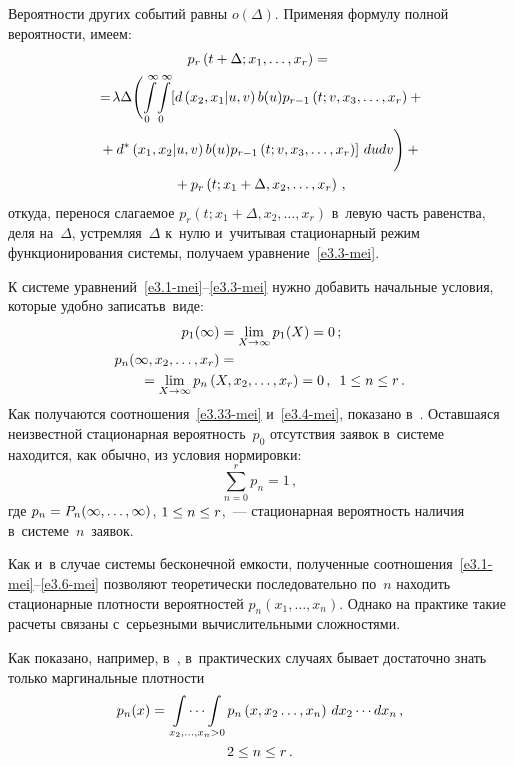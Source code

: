 \begin{multicols}{2}
Вероятности других событий равны $o(\Delta)$.
Применяя формулу полной вероятности, имеем:
\begin{multline*}
p_{r}\left(t+\Delta;x_1,\ldots,x_r\right) ={}\\
\!{}=\!
\lambda\Delta \Bigg(\!
\int\limits_0^\infty \!\int\limits_0^\infty\!
\left[d\left(x_2,x_1|u,v\right) b(u) p_{r-1}\left(t;v,x_3,\ldots,x_r\right)
+{}\right.\hspace*{-3.62766pt}
\\
\left.{}+
d^*\left(x_1,x_2|u,v\right) b(u) p_{r-1}\left(t;v,x_3,\ldots,x_r\right)\right]
\,du dv \Bigg)
+ {}\\
{}+p_{r}\left(t;x_1+\Delta,x_2,\ldots,x_r\right)\,,
\end{multline*}
откуда, перенося слагаемое
$p_r(t;x_1+\Delta,x_2,\ldots,x_{r})$ в~левую часть равенства, деля на~$\Delta$,
устремляя~$\Delta$ к~нулю и~учитывая стационарный режим функционирования системы,
получаем уравнение~\eqref{e3.3-mei}.


К системе уравнений~\eqref{e3.1-mei}--\eqref{e3.3-mei} 
нужно добавить начальные условия, которые удобно записать\linebreak \mbox{в~виде}:
\begin{align}
p_{1}(\infty) &= \lim\limits_{X\to \infty} p_{1}(X)
= 0\,; \label{e3.33-mei}
\\
p_{n}(\infty,x_2,\ld,x_r)
&= {}\notag\\
&\hspace*{-20mm}{}=\lim\limits_{X\to \infty} p_{n}\left(X,x_2,\ld,x_r\right)
= 0\,,\enskip
1 \le n \le r\,.
\label{e3.4-mei}
\end{align}
Как получаются соотношения~\eqref{e3.33-mei} и~\eqref{e3.4-mei},
показано в~\cite{n1}.
Оставшаяся неизвестной стационарная вероятность~$p_0$ отсутствия заявок в~системе
находится, как обычно, из условия нормировки:
\begin{equation}
\label{e3.6-mei}
\sum\limits_{n=0}^r p_n = 1\,, 
\end{equation}
где
$p_n=P_n(\infty,\ldots,\infty)$, $1 \hm\le n\hm \le r$,~---
стационарная вероятность наличия в~системе~$n$~заявок.

Как и~в случае системы бесконечной емкости,
полученные соотношения~\eqref{e3.1-mei}--\eqref{e3.6-mei} позволяют
теоретически последовательно по~$n$
находить стационарные плотности вероятностей $p_n(x_1,\ldots,x_{n})$.
Однако на практике такие расчеты связаны с~серьезными вычислительными сложностями.


Как показано, например, в~\cite{n3}, в~практических случаях
бывает достаточно знать только маргинальные плотности
\begin{multline*}
p_{n}(x) = \mathop{\int\cdots\int}\limits_{x_2,\ldots,x_n>0}
p_{n}\left(x,x_2\ldots,x_n\right)\,dx_2\cdots dx_n\,,
\\ 
2 \le n \le r\,.
\end{multline*}


\end{multicols}
